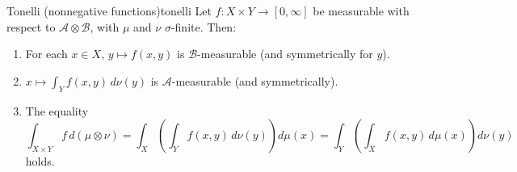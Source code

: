 \documentclass[11pt, a4paper]{article}
\begin{document}
\begin{teorema}{Tonelli (nonnegative functions)}{tonelli}
Let $f: X \times Y \to [0, \infty]$ be measurable with respect to $\mathcal{A} \otimes \mathcal{B}$, with
$\mu$ and $\nu$ $\sigma$-finite. Then:
\begin{enumerate}
    \item For each $x \in X$, $y \mapsto f(x, y)$ is $\mathcal{B}$-measurable (and symmetrically
    for $y$).
    \item $x \mapsto \int_Y f(x, y) \, d\nu(y)$ is $\mathcal{A}$-measurable (and symmetrically).
    \item The equality
    $$ \int_{X \times Y} f \, d(\mu \otimes \nu) = \int_X \!\left( \int_Y f(x, y) \, d\nu(y)
    \right) d\mu(x) = \int_Y \!\left( \int_X f(x, y) \, d\mu(x) \right) d\nu(y) $$
    holds.
\end{enumerate}
\end{teorema}
\end{document}
